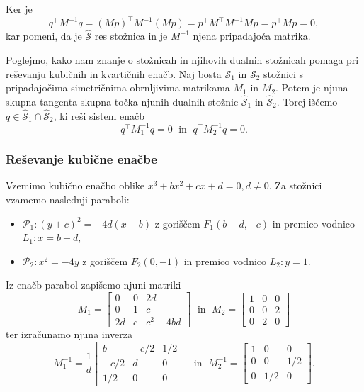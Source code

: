 Ker je
$$ q^\intercal M^{-1} q = (Mp)^\intercal M^{-1} (Mp) = p^\intercal M^\intercal M^{-1} M p = p^\intercal M p = 0,$$
kar pomeni, da je $\mathcal{\hat{S}}$ res stožnica in je $M^{-1}$ njena pripadajoča matrika.

Poglejmo, kako nam znanje o stožnicah in njihovih dualnih stožnicah pomaga pri reševanju kubičnih in kvartičnih enačb. Naj bosta $\mathcal{S}_1$ in $\mathcal{S}_2$ stožnici s pripadajočima simetričnima obrnljivima matrikama $M_1$ in $M_2$. Potem je njuna skupna tangenta skupna točka njunih dualnih stožnic $\mathcal{\hat{S}}_1$ in $\mathcal{\hat{S}}_2$. Torej iščemo $q \in \mathcal{\hat{S}}_1 \cap \mathcal{\hat{S}}_2$, ki reši sistem enačb
\begin{equation}
    \label{eq:afin_sistem_tangenta_splosen}
    q^\intercal M^{-1}_1 q = 0 \; \text{ in } \; q^\intercal M^{-1}_2 q = 0.
\end{equation}

\subsubsection*{Reševanje kubične enačbe}

Vzemimo kubično enačbo oblike $ x^3 + bx^2 + cx + d = 0, d \neq 0$. Za stožnici vzamemo naslednji paraboli:
\begin{itemize}
    \item $\mathcal{P}_1: (y+c)^2 = -4d(x-b)$ z goriščem $F_1 (b - d, -c)$ in premico vodnico $L_1: x = b + d$,
    \item $\mathcal{P}_2: x^2 = -4y$ z goriščem $F_2 (0, -1)$ in premico vodnico $L_2: y = 1$.
\end{itemize}

Iz enačb parabol zapišemo njuni matriki
$$ M_1 =
    \begin{bmatrix}
        0 & 0 & 2d\\
        0 & 1 & c\\
        2d & c & c^2-4bd
    \end{bmatrix}
    \; \text{ in } \; M_2 =
    \begin{bmatrix}
        1 & 0 & 0\\
        0 & 0 & 2\\
        0 & 2 & 0
    \end{bmatrix}
$$
ter izračunamo njuna inverza
$$ M^{-1}_1 = \frac{1}{d}
    \begin{bmatrix}
        b & -c/2 & 1/2\\
        -c/2 & d & 0\\
        1/2 & 0 & 0
    \end{bmatrix}
\; \text{ in } \; M^{-1}_2 =
    \begin{bmatrix}
        1 & 0 & 0\\
        0 & 0 & 1/2\\
        0 & 1/2 & 0
    \end{bmatrix}.
$$

